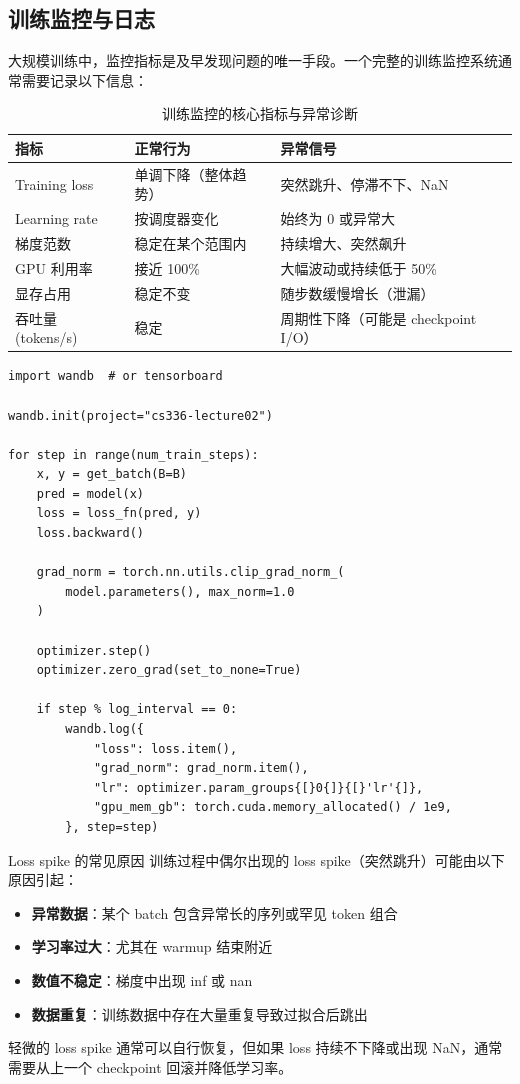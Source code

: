 \subsection{训练监控与日志}

大规模训练中，监控指标是及早发现问题的唯一手段。一个完整的训练监控系统通常需要记录以下信息：

\begin{table}[H]
\centering
\begin{tabular}{p{}p{}p{}}
\toprule
\textbf{指标} & \textbf{正常行为} & \textbf{异常信号} \\
\midrule
Training loss & 单调下降（整体趋势） & 突然跳升、停滞不下、NaN \\
Learning rate & 按调度器变化 & 始终为 0 或异常大 \\
梯度范数 & 稳定在某个范围内 & 持续增大、突然飙升 \\
GPU 利用率 & 接近 100\% & 大幅波动或持续低于 50\% \\
显存占用 & 稳定不变 & 随步数缓慢增长（泄漏） \\
吞吐量 (tokens/s) & 稳定 & 周期性下降（可能是 checkpoint I/O） \\
\bottomrule
\end{tabular}
\caption{训练监控的核心指标与异常诊断}
\end{table}

\begin{lstlisting}[caption={训练循环中的日志记录示例}]
import wandb  # or tensorboard

wandb.init(project="cs336-lecture02")

for step in range(num_train_steps):
    x, y = get_batch(B=B)
    pred = model(x)
    loss = loss_fn(pred, y)
    loss.backward()

    grad_norm = torch.nn.utils.clip_grad_norm_(
        model.parameters(), max_norm=1.0
    )

    optimizer.step()
    optimizer.zero_grad(set_to_none=True)

    if step % log_interval == 0:
        wandb.log({
            "loss": loss.item(),
            "grad_norm": grad_norm.item(),
            "lr": optimizer.param_groups{[}0{]}{[}'lr'{]},
            "gpu_mem_gb": torch.cuda.memory_allocated() / 1e9,
        }, step=step)
\end{lstlisting}

\begin{knowledgebox}{Loss spike 的常见原因}
训练过程中偶尔出现的 loss spike（突然跳升）可能由以下原因引起：
\begin{itemize}
    \item \textbf{异常数据}：某个 batch 包含异常长的序列或罕见 token 组合
    \item \textbf{学习率过大}：尤其在 warmup 结束附近
    \item \textbf{数值不稳定}：梯度中出现 inf 或 nan
    \item \textbf{数据重复}：训练数据中存在大量重复导致过拟合后跳出
\end{itemize}
轻微的 loss spike 通常可以自行恢复，但如果 loss 持续不下降或出现 NaN，通常需要从上一个 checkpoint 回滚并降低学习率。
\end{knowledgebox}

